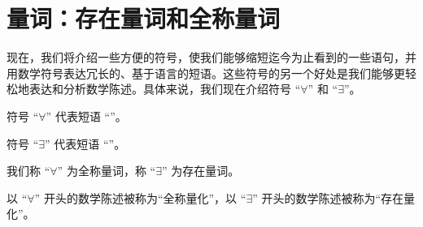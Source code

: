 \section{量词：存在量词和全称量词}

现在，我们将介绍一些方便的符号，使我们能够缩短迄今为止看到的一些语句，并用数学符号表达冗长的、基于语言的短语。这些符号的另一个好处是我们能够更轻松地表达和分析数学陈述。具体来说，我们现在介绍符号 ``$\forall$'' 和 ``$\exists$''。

\begin{definition}
    符号 ``$\forall$'' 代表短语 ``''。

    符号 ``$\exists$'' 代表短语 ``''。

    我们称 ``$\forall$'' 为全称量词，称 ``$\exists$'' 为存在量词。

    以 ``$\forall$'' 开头的数学陈述被称为``全称量化''，以 ``$\exists$'' 开头的数学陈述被称为``存在量化''。
\end{definition}









